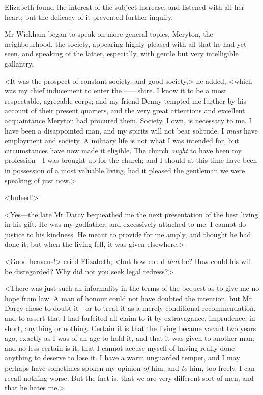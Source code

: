 Elizabeth found the interest of the subject increase, and listened with all her heart; but the delicacy of it prevented further inquiry.

Mr Wickham began to speak on more general topics, Meryton, the neighbourhood, the society, appearing highly pleased with all that he had yet seen, and speaking of the latter, especially, with gentle but very intelligible gallantry.

<It was the prospect of constant society, and good society,> he added, <which was my chief inducement to enter the ⸺shire. I know it to be a most respectable, agreeable corps; and my friend Denny tempted me further by his account of their present quarters, and the very great attentions and excellent acquaintance Meryton had procured them. Society, I own, is necessary to me. I have been a disappointed man, and my spirits will not bear solitude. I \textit{must} have employment and society. A military life is not what I was intended for, but circumstances have now made it eligible. The church \textit{ought} to have been my profession—I was brought up for the church; and I should at this time have been in possession of a most valuable living, had it pleased the gentleman we were speaking of just now.>

<Indeed!>

<Yes—the late Mr Darcy bequeathed me the next presentation of the best living in his gift. He was my godfather, and excessively attached to me. I cannot do justice to his kindness. He meant to provide for me amply, and thought he had done it; but when the living fell, it was given elsewhere.>

<Good heavens!> cried Elizabeth; <but how could \textit{that} be? How could his will be disregarded? Why did not you seek legal redress?>

<There was just such an informality in the terms of the bequest as to give me no hope from law. A man of honour could not have doubted the intention, but Mr Darcy chose to doubt it—or to treat it as a merely conditional recommendation, and to assert that I had forfeited all claim to it by extravagance, imprudence, in short, anything or nothing. Certain it is that the living became vacant two years ago, exactly as I was of an age to hold it, and that it was given to another man; and no less certain is it, that I cannot accuse myself of having really done anything to deserve to lose it. I have a warm unguarded temper, and I may perhaps have sometimes spoken my opinion \textit{of} him, and \textit{to} him, too freely. I can recall nothing worse. But the fact is, that we are very different sort of men, and that he hates me.>

